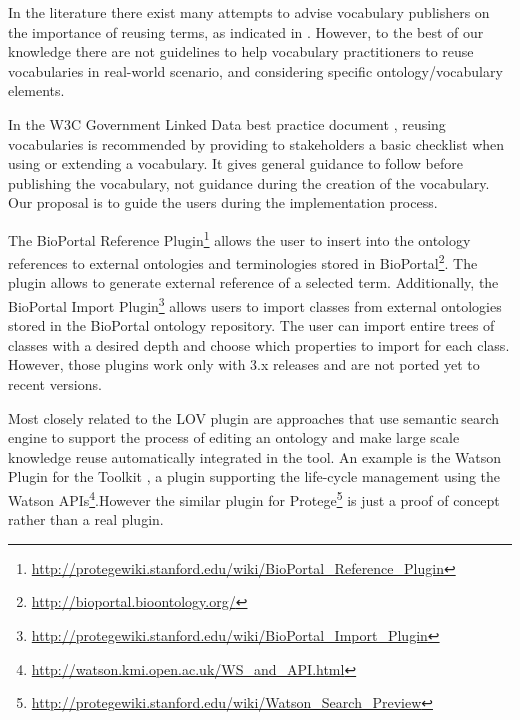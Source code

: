In the literature there exist many attempts to advise vocabulary publishers on the importance of reusing terms, as indicated in \cite{janowicz2014five,jimenez2008}. However, to the best of our knowledge there are not guidelines to help vocabulary practitioners to reuse vocabularies in real-world scenario, and considering specific ontology/vocabulary elements. 

In the W3C Government Linked Data best practice document \cite{hyland14}, reusing vocabularies is recommended by providing to stakeholders a basic checklist when using or extending a vocabulary. It gives general guidance to follow before publishing the vocabulary, not guidance during the creation of the vocabulary. Our proposal is to guide the users during the implementation process.

The BioPortal Reference Plugin\footnote{\url{http://protegewiki.stanford.edu/wiki/BioPortal_Reference_Plugin}} allows the user to insert into the ontology references to external ontologies and terminologies stored in BioPortal\footnote{\url{http://bioportal.bioontology.org/}}. The plugin allows to generate external reference of a selected term. Additionally, the BioPortal Import Plugin\footnote{\url{http://protegewiki.stanford.edu/wiki/BioPortal_Import_Plugin}} allows users to import classes from external ontologies stored in the BioPortal ontology repository. The user can import entire trees of classes with a desired depth and choose which properties to import for each class. However, those plugins work only with \protege 3.x releases and are not ported yet to recent versions. 

Most closely related to the {\protege}LOV plugin are approaches that use semantic search engine to support the process of editing an ontology and make large scale knowledge reuse automatically integrated in the tool. An example is the Watson Plugin \cite{neonguide2008} for the \neon Toolkit \cite{haase2008neon}, a plugin supporting the \neon life-cycle management using the Watson \cite{d2007watson} APIs\footnote{\url{http://watson.kmi.open.ac.uk/WS_and_API.html}}.However the similar plugin for Protege\footnote{\url{http://protegewiki.stanford.edu/wiki/Watson_Search_Preview}} is just a proof of concept rather than a real plugin.

 
